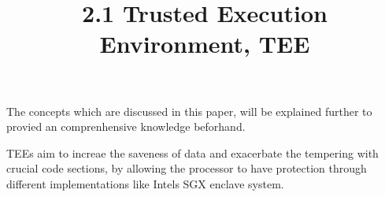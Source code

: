 The concepts which are discussed in this paper, will be explained further to provied an comprenhensive knowledge beforhand.

\title{2.1 Trusted Execution Environment, TEE}

TEEs aim to increae the saveness of data and exacerbate the tempering with crucial code sections, by allowing the processor to have protection through different implementations 
like Intels SGX enclave system. 